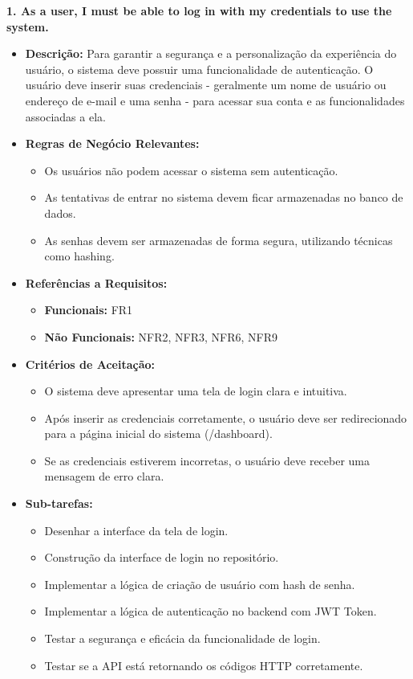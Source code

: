 \textbf{1. As a user, I must be able to log in with my credentials to use the system.}
\begin{itemize}
    \item \textbf{Descrição:} Para garantir a segurança e a personalização da experiência do usuário, o sistema deve possuir uma funcionalidade de autenticação. O usuário deve inserir suas credenciais - geralmente um nome de usuário ou endereço de e-mail e uma senha - para acessar sua conta e as funcionalidades associadas a ela.
    \item \textbf{Regras de Negócio Relevantes:} 
        \begin{itemize}
            \item Os usuários não podem acessar o sistema sem autenticação.
            \item As tentativas de entrar no sistema devem ficar armazenadas no banco de dados.
            \item As senhas devem ser armazenadas de forma segura, utilizando técnicas como hashing.
        \end{itemize}

    \item \textbf{Referências a Requisitos:}
        \begin{itemize}
            \item \textbf{Funcionais:} FR1
            \item \textbf{Não Funcionais:} NFR2, NFR3, NFR6, NFR9 
        \end{itemize}

    \item \textbf{Critérios de Aceitação:}
        \begin{itemize}
            \item O sistema deve apresentar uma tela de login clara e intuitiva.
            \item Após inserir as credenciais corretamente, o usuário deve ser redirecionado para a página inicial do sistema (/dashboard).
            \item Se as credenciais estiverem incorretas, o usuário deve receber uma mensagem de erro clara.
        \end{itemize}

        \item \textbf{Sub-tarefas:}
            \begin{itemize}
                \item Desenhar a interface da tela de login.
                \item Construção da interface de login no repositório.
                \item Implementar a lógica de criação de usuário com hash de senha.
                \item Implementar a lógica de autenticação no backend com \gls{JWT} Token.
                \item Testar a segurança e eficácia da funcionalidade de login.
                \item Testar se a \gls{API} está retornando os códigos \gls{HTTP} corretamente.
            \end{itemize}

\end{itemize}

